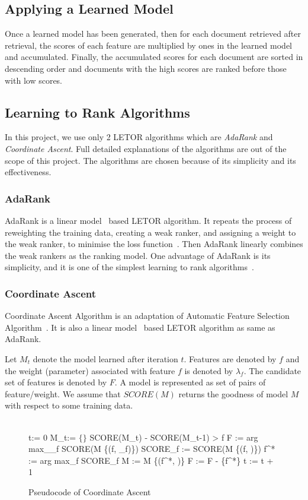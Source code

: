 \subsection{Applying a Learned Model}\label{sec:background_applyLearnedModel}
Once a learned model has been generated, then for each document retrieved after retrieval, 
the scores of each feature are multiplied by ones in the learned model and accumulated.
Finally, the accumulated scores for each document are sorted in descending order and documents with the high scores are ranked before
those with low scores.

\subsection{Learning to Rank Algorithms}
In this project, we use only 2 LETOR algorithms which are \textit{AdaRank} and \textit{Coordinate Ascent}. Full detailed explanations of the algorithms 
are out of the scope of this project. The algorithms are chosen because of its simplicity and its effectiveness.

\subsubsection{AdaRank}
AdaRank is a linear model~\cite[P. 1-4]{mlSimon} based LETOR algorithm.
It repeats the process of reweighting the training data, creating a weak ranker, and assigning a weight to the weak ranker, to minimise the loss 
function~\cite[P. 60]{letorBook}. Then AdaRank linearly combines the weak rankers as the ranking model. One advantage of AdaRank is its simplicity, and it is one of the simplest
learning to rank algorithms~\cite[P. 60]{letorBook}.

\subsubsection{Coordinate Ascent}
Coordinate Ascent Algorithm is an adaptation of Automatic Feature Selection Algorithm~\cite{caAlg}. It is also a linear model~\cite[P. 1-4]{mlSimon} 
based LETOR algorithm as same as AdaRank.

Let $M_t$ denote the model learned after iteration $t$. Features are denoted by $f$ and the weight (parameter) associated with feature $f$ is 
denoted by $\lambda_f$. The candidate set of features is denoted by $F$. A model is represented as set of pairs of feature/weight. We assume that
$SCORE(M)$ returns the goodness of model $M$ with respect to some training data.
\begin{figure}
\begin{program}
\BEGIN \\
  t:= 0
  M_t:= $\{\}$
  \WHILE SCORE(M_t) - SCORE(M_{t-1}) > \in \DO
    \FOR f \in F \DO
      \hat{\lambda} := arg max_{\lambda_f} SCORE(M \cup \{(f, \lambda_f)\}) 
      SCORE_f := SCORE(M \cup \{(f, )\})
    \END
  f^* := arg max_f SCORE_f
  M := M \cup \{(f^*, )\}
  F := F - \{f^*\}
  t := t + 1
  \END
\END
\end{program}
\caption{Pseudocode of Coordinate Ascent}\label{fig:caAlg}
\end{figure}

